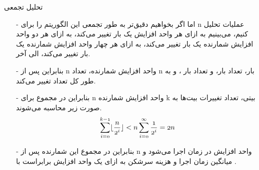 \begin{frame}{‌تحلیل تجمعی}
\begin{itemize}\itemr
\item[-]
اما اگر بخواهیم دقیق‌تر به طور تجمعی این الگوریتم را برای n عملیات تحلیل کنیم، می‌بینیم
به ازای هر واحد افزایش یک بار تغییر می‌کند،
به ازای هر دو واحد افزایش شمارنده یک بار تغییر می‌کند،
به ازای هر چهار واحد افزایش شمارنده یک بار تغییر می‌کند، الی آخر.
\item[-]
بنابراین پس از n واحد افزایش شمارنده،
تعداد n بار،
تعداد
بار، و
تعداد
بار ، و به طور کل
تعداد
تغییر می‌کند.
\item[-]
بنابراین در مجموع برای n واحد افزایش شمارنده k بیتی، تعداد تغییرات بیت‌ها به صورت زیر محاسبه می‌شوند.
\begin{align*}
\mathnormal{\sum_{i = 0}^{k - 1} \lfloor \frac{n}{2^i} \rfloor < n \sum_{i = 0}^{\infty} \frac{1}{2^i} = 2n}
\end{align*}
\item[-]
بنابراین در مجموع این شمارنده پس از n واحد افزایش در زمان
اجرا می‌شود و میانگین زمان اجرا و هزینه سرشکن به ازای یک واحد افزایش برابراست با
.
\end{itemize}
\end{frame}